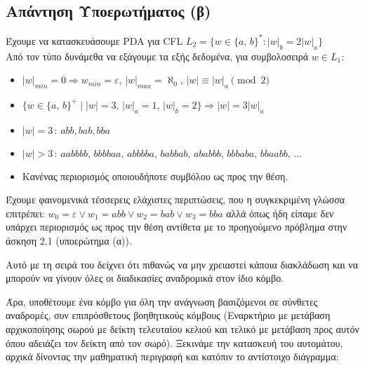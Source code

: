 \subsection{Απάντηση Υποερωτήματος (β)}
\label{ssec:Solution_2.2}
\doublespacing
Έχουμε να κατασκευάσουμε PDA για CFL $L_2 = \{w \in \{a,\,b\}^* : |w|_b = 2|w|_a \}$\\
Από τον τύπο δυνάμεθα να εξάγουμε τα εξής δεδομένα, για συμβολοσειρά $w \in L_1$:
\reducevspace\reducevspace\reducevspace\reducevspace\reducevspace\reducevspace
\begin{itemize}
	\itemsep0em
	\item $\vert w \vert_{min} = 0 \Longrightarrow w_{min} = ε$, \quad $\vert w \vert_{max} =
	\aleph_0$, \quad $|w| \equiv |w|_a \pmod{2}$
	\item $\{w \in \{a,\,b\}^+ \;\vert\; |w| = 3,\, |w|_a = 1,\, |w|_b = 2\} \Longrightarrow |w| = 3|w|_a$
	\item $|w| = 3\,:\, abb, bab, bba$
	\item $|w| > 3\,:\, aabbbb,\, bbbbaa,\, abbbba,\, babbab,\, ababbb,\, bbbaba,\, bbaabb,\,...$
	\item Κανένας περιορισμός οποιουδήποτε συμβόλου ως προς την θέση.
\end{itemize}
\reducevspace\reducevspace
\par
Έχουμε φαινομενικά τέσσερεις ελάχιστες περιπτώσεις, που η συγκεκριμένη γλώσσα επιτρέπει:
$w_0 = ε \lor w_1 = abb \lor w_2 = bab \lor w_3 = bba$ αλλά όπως ήδη είπαμε δεν υπάρχει περιορισμός ως προς την
θέση αντίθετα με το προηγούμενο πρόβλημα στην άσκηση 2.1 (υποερώτημα (α)).
\par
Αυτό με τη σειρά του δείχνει ότι πιθανώς να μην χρειαστεί κάποια διακλάδωση και να μπορούν να γίνουν όλες οι
διαδικασίες αναδρομικά στον ίδιο κόμβο.
\par Άρα, υποθέτουμε ένα κόμβο για όλη την ανάγνωση βασιζόμενοι σε σύνθετες αναδρομές, συν επιπρόσθετους
βοηθητικούς κόμβους (Εναρκτήριο με μετάβαση αρχικοποίησης σωρού με δείκτη τελευταίου κελιού και τελικό με μετάβαση
προς αυτόν όπου αδειάζει τον δείκτη από τον σωρό). Ξεκινάμε την κατασκευή του αυτομάτου, αρχικά δίνοντας την
μαθηματική περιγραφή και κατόπιν το αντίστοιχο διάγραμμα:

